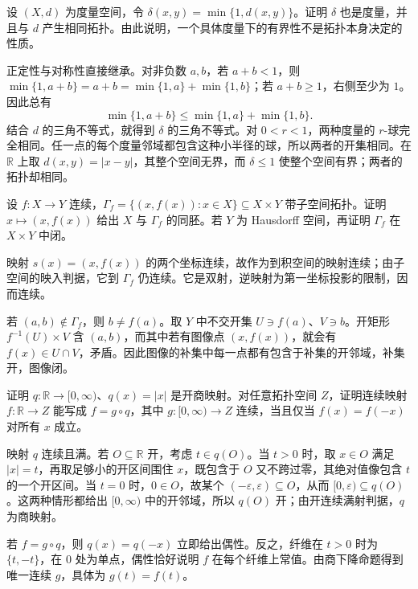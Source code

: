\BookExercises

\begin{exercise}\label{g1:ex:truncated-metric}
	设 \((X,d)\) 为度量空间，令 \(\delta(x,y)=\min\{1,d(x,y)\}\)。证明 \(\delta\) 也是度量，并且与 \(d\) 产生相同拓扑。由此说明，一个具体度量下的有界性不是拓扑本身决定的性质。
\end{exercise}
\begin{solution}
	正定性与对称性直接继承。对非负数 \(a,b\)，若 \(a+b<1\)，则 \(\min\{1,a+b\}=a+b=\min\{1,a\}+\min\{1,b\}\)；若 \(a+b\ge1\)，右侧至少为 \(1\)。因此总有
	\[
		\min\{1,a+b\}\le\min\{1,a\}+\min\{1,b\}.
	\]
	结合 \(d\) 的三角不等式，就得到 \(\delta\) 的三角不等式。对 \(0<r<1\)，两种度量的 \(r\)-球完全相同。任一点的每个度量邻域都包含这种小半径的球，所以两者的开集相同。在 \(\mathbb R\) 上取 \(d(x,y)=|x-y|\)，其整个空间无界，而 \(\delta\le1\) 使整个空间有界；两者的拓扑却相同。
\end{solution}

\begin{exercise}\label{g1:ex:continuous-graph}
	设 \(f:X\to Y\) 连续，\(\Gamma_f=\{(x,f(x)):x\in X\}\subseteq X\times Y\) 带子空间拓扑。证明 \(x\mapsto(x,f(x))\) 给出 \(X\) 与 \(\Gamma_f\) 的同胚。若 \(Y\) 为 Hausdorff 空间，再证明 \(\Gamma_f\) 在 \(X\times Y\) 中闭。
\end{exercise}
\begin{solution}
	映射 \(s(x)=(x,f(x))\) 的两个坐标连续，故作为到积空间的映射连续；由子空间的映入判据，它到 \(\Gamma_f\) 仍连续。它是双射，逆映射为第一坐标投影的限制，因而连续。

	若 \((a,b)\notin\Gamma_f\)，则 \(b\ne f(a)\)。取 \(Y\) 中不交开集 \(U\ni f(a)\)、\(V\ni b\)。开矩形 \(f^{-1}(U)\times V\) 含 \((a,b)\)，而其中若有图像点 \((x,f(x))\)，就会有 \(f(x)\in U\cap V\)，矛盾。因此图像的补集中每一点都有包含于补集的开邻域，补集开，图像闭。
\end{solution}

\begin{exercise}\label{g1:ex:absolute-value-quotient}
	证明 \(q:\mathbb R\to[0,\infty)\)、\(q(x)=|x|\) 是开商映射。对任意拓扑空间 \(Z\)，证明连续映射 \(f:\mathbb R\to Z\) 能写成 \(f=g\circ q\)，其中 \(g:[0,\infty)\to Z\) 连续，当且仅当 \(f(x)=f(-x)\) 对所有 \(x\) 成立。
\end{exercise}
\begin{solution}
	映射 \(q\) 连续且满。若 \(O\subseteq\mathbb R\) 开，考虑 \(t\in q(O)\)。当 \(t>0\) 时，取 \(x\in O\) 满足 \(|x|=t\)，再取足够小的开区间围住 \(x\)，既包含于 \(O\) 又不跨过零，其绝对值像包含 \(t\) 的一个开区间。当 \(t=0\) 时，\(0\in O\)，故某个 \((-\varepsilon,\varepsilon)\subseteq O\)，从而 \([0,\varepsilon)\subseteq q(O)\)。这两种情形都给出 \([0,\infty)\) 中的开邻域，所以 \(q(O)\) 开；由开连续满射判据，\(q\) 为商映射。

	若 \(f=g\circ q\)，则 \(q(x)=q(-x)\) 立即给出偶性。反之，纤维在 \(t>0\) 时为 \(\{t,-t\}\)，在 \(0\) 处为单点，偶性恰好说明 \(f\) 在每个纤维上常值。由商下降命题得到唯一连续 \(g\)，具体为 \(g(t)=f(t)\)。
\end{solution}

